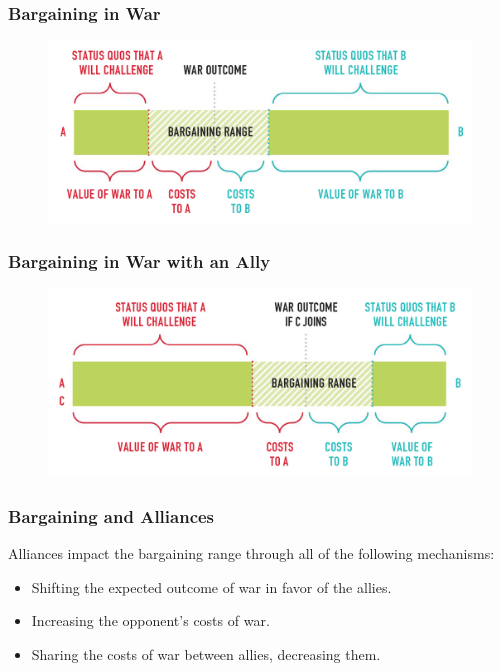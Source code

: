 \documentclass{beamer}
\begin{document}
\begin{frame} 
	\frametitle{\LARGE{Bargaining in War}}
	\begin{figure}[ht!]
		\centering
		\includegraphics[width=\textwidth,height=0.8\textheight,keepaspectratio]{./nonally_bargain.png}
	\end{figure}
\end{frame}

\begin{frame} 
	\frametitle{\LARGE{Bargaining in War with an Ally}}
	\begin{figure}[ht!]
		\centering
		\includegraphics[width=\textwidth,height=0.8\textheight,keepaspectratio]{./ally_bargain.png}
	\end{figure}
\end{frame}

\begin{frame} 
\frametitle{\LARGE{Bargaining and Alliances}}
Alliances impact the bargaining range through all of the following mechanisms:
	\begin{itemize}
		\item Shifting the expected outcome of war in favor of the allies. \pause 
		\item Increasing the opponent's costs of war. \pause
		\item Sharing the costs of war between allies, decreasing them.
	\end{itemize}
\end{frame}
\end{document}
